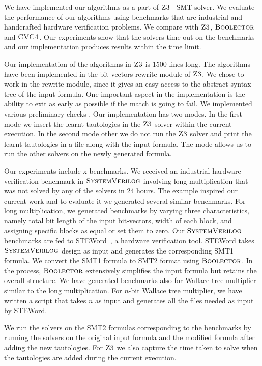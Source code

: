 

We have implemented our algorithms as a part of $\textsc{Z3}$~\cite{z3} SMT solver.  We evaluate the performance of our algorithms using benchmarks that are industrial and handcrafted hardware verification problems. We compare with $\textsc{Z3}$, $\textsc{Boolector}$\cite{Boolector} and $\textsc{CVC4}$\cite{cvc4}. Our experiments show that the solvers time out on the benchmarks and our implementation produces results within the time limit.

Our implementation of the algorithms in $\textsc{Z3}$ is 1500 lines long. The algorithms have been implemented in the bit vectors rewrite module of $\textsc{Z3}$. We chose to work in the rewrite module, since it gives an easy access to the abstract syntax tree of the input formula. One important aspect in the implementation is the ability to exit as early as possible if the match is going to fail. We implemented various preliminary checks . Our implementation has two modes. In the first mode we insert the learnt tautologies in the $\textsc{Z3}$ solver within the current execution. In the second mode other we do not run  the $\textsc{Z3}$ solver and print the learnt tautologies in a file along with the input formula. The mode allows us to run the other solvers on the newly generated formula.

Our experiments include x benchmarks. We received an industrial hardware verification benchmark in $\textsc{SystemVerilog}$ involving long multiplication that was not solved by any of the solvers in 24 hours. The example inspired our current work and to evaluate it we generated several similar benchmarks. For long multiplication, we generated benchmarks by varying three characteristics, namely total bit length of the input bit-vectors, width of each block, and assigning specific blocks as equal or set them to zero. Our $\textsc{SystemVerilog}$ benchmarks are fed to STEWord~\cite{Word-level Symbolic Trajectory Evaluation}, a hardware verification tool. STEWord takes $\textsc{SystemVerilog}$ design as input and generates the corresponding SMT1 formula. We convert the SMT1 formula to SMT2 format using $\textsc{Boolector}$. In the process, $\textsc{Boolector}$ extensively simplifies the input formula but retains the overall structure. We have generated benchmarks also for Wallace tree multiplier similar to the long multiplication. For $n$-bit Wallace tree multiplier, we have written a script that takes $n$ as input and generates all the files needed as input by STEWord. 

We run the solvers on the SMT2 formulas corresponding to the benchmarks by running the solvers on the original input formula and the modified formula after adding the new tautologies. For $\textsc{Z3}$ we also capture the time taken to solve when the tautologies are added during the current execution.

